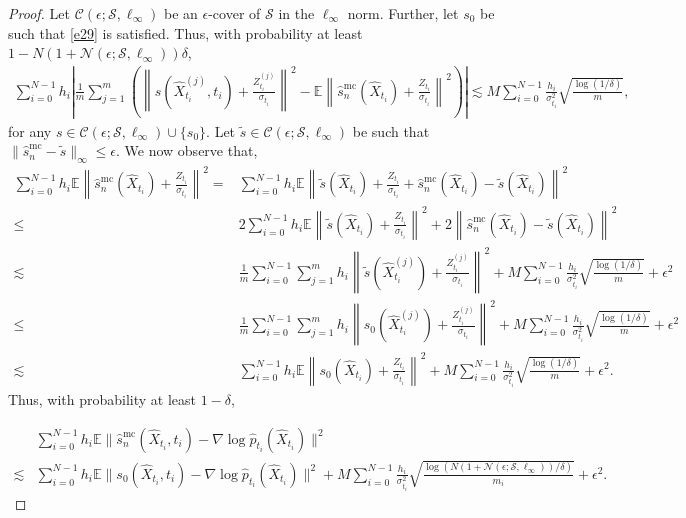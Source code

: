 \documentclass[12pts]{article}
\newcommand{\cC}{ \mathcal{C}}
\newcommand{\cN}{ \mathcal{N}}
\newcommand{\sS}{ \mathscr{S}}
\newcommand{\hX}{ \widehat{X}}
\newcommand{\E}{\mathbb{E}}
\newcommand{\hp}{\hat{p}}
\begin{document}
\begin{proof}
Let $\cC\left(\epsilon; \sS, \ell_\infty\right)$ be an $\epsilon$-cover of $\sS$ in the $\ell_\infty$ norm. Further, let $s_0$ be such that \eqref{e29} is satisfied.  Thus, with probability at least $1-N \left( 1+ \cN\left(\epsilon; \sS, \ell_\infty\right) \right) \delta $, 
\begin{align}
    \sum_{i=0}^{N-1} h_i\left|\frac{1}{ m}   \sum_{j=1}^m \left(\left\| s\left( \hX_{t_i}^{(j)}, t_i\right) + \frac{Z_{t_i}^{(j)}}{\sigma_{t_i}}  \right\|^2 - \E \left\|\hat{s}^{\mathrm{mc}}_n(\hX_{t_i}) + \frac{Z_{t_i}}{\sigma_{t_i}}\right\|^2\right)\right|
    \lesssim  M \sum_{i=0}^{N-1} \frac{h_i}{\sigma_{t_i}^2}\sqrt{\frac{\log(1/\delta)}{m}},
\end{align}
for any $s \in \cC\left(\epsilon; \sS, \ell_\infty\right) \cup \{s_0\}$. Let $\tilde{s} \in \cC\left(\epsilon; \sS, \ell_\infty\right)$ be such that $\|\hat{s}^{\mathrm{mc}}_n-\tilde{s}\|_\infty \le \epsilon$. We now observe that, 
\begingroup
\allowdisplaybreaks
\begin{align}
      \sum_{i=0}^{N-1} h_i \E \left\|\hat{s}^{\mathrm{mc}}_n(\hX_{t_i}) + \frac{Z_{t_i}}{\sigma_{t_i}}\right\|^2  
     = & \sum_{i=0}^{N-1} h_i \E \left\|\tilde{s}(\hX_{t_i}) + \frac{Z_{t_i}}{\sigma_{t_i}}  + \hat{s}^{\mathrm{mc}}_n(\hX_{t_i}) - \tilde{s}(\hX_{t_i})\right\|^2 \nonumber \\
     \le & 2 \sum_{i=0}^{N-1} h_i \E \left\|\tilde{s}(\hX_{t_i}) + \frac{Z_{t_i}} {\sigma_{t_i}} \right\|^2 + 2 \left\|\hat{s}^{\mathrm{mc}}_n(\hX_{t_i}) - \tilde{s}(\hX_{t_i})\right\|^2 \nonumber \\
     \lesssim & \frac{1}{m}\sum_{i=0}^{N-1} \sum_{j=1}^m h_i  \left\|\tilde{s}(\hX_{t_i}^{(j)}) + \frac{Z_{t_i}^{(j)}} {\sigma_{t_i}} \right\|^2 + M \sum_{i=0}^{N-1} \frac{h_i}{\sigma_{t_i}^2}\sqrt{\frac{\log(1/\delta)}{m}}+ \epsilon^2 \nonumber\\
     \le & \frac{1}{m}\sum_{i=0}^{N-1} \sum_{j=1}^m h_i  \left\|s_0(\hX_{t_i}^{(j)}) + \frac{Z_{t_i}^{(j)}} {\sigma_{t_i}} \right\|^2 + M \sum_{i=0}^{N-1} \frac{h_i}{\sigma_{t_i}^2}\sqrt{\frac{\log(1/\delta)}{m}}
     + \epsilon^2 \nonumber\\
     \lesssim & \sum_{i=0}^{N-1} h_i \E \left\|s_0(\hX_{t_i}) + \frac{Z_{t_i}}{\sigma_{t_i}}\right\|^2 + M \sum_{i=0}^{N-1} \frac{h_i}{\sigma_{t_i}^2}\sqrt{\frac{\log(1/\delta)}{m}}
     + \epsilon^2.
\end{align}
\endgroup
Thus, with probability at least $1-\delta$,

\begin{align}
    & \sum_{i=0}^{N-1} h_i \E \| \hat{s}^{\mathrm{mc}}_n(\hX_{t_i}, t_i) - \nabla \log \hp_{t_i}(\hX_{t_i})\|^2 \nonumber \\
    \lesssim &  \sum_{i=0}^{N-1} h_i \E \| s_0(\hX_{t_i}, t_i) - \nabla \log \hp_{t_i}(\hX_{t_i})\|^2 + M \sum_{i=0}^{N-1} \frac{h_i}{\sigma_{t_i}^2}\sqrt{\frac{\log(N \left( 1+ \cN\left(\epsilon; \sS, \ell_\infty\right) \right)/\delta)}{m_i}}
     + \epsilon^2.
\end{align}
\end{proof}
\end{document}

